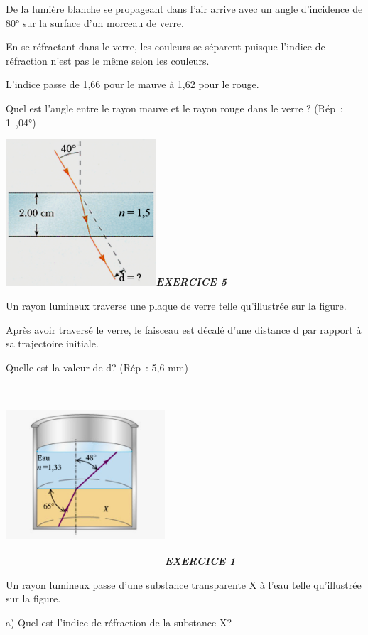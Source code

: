 De la lumière blanche se propageant dans l'air arrive avec un angle
d'incidence de 80° sur la surface d'un morceau de verre.

En se réfractant dans le verre, les couleurs se séparent puisque
l'indice de réfraction n'est pas le même selon les couleurs.

L'indice passe de 1,66 pour le mauve à 1,62 pour le rouge.

Quel est l'angle entre le rayon mauve et le rayon rouge dans le
verre\textbf{ }? (Rép~: 1~,04°)

\includegraphics[width=5.597cm,height=5.456cm]{Pictures/10000001000002CA000002B85275081FCFD04057.png}\emph{\textbf{EXERCICE
5}}

Un rayon lumineux traverse une plaque de verre telle qu'illustrée sur la
figure.

Après avoir traversé le verre, le faisceau est décalé d'une distance d
par rapport à sa trajectoire initiale.

Quelle est la valeur de d? (Rép~: 5,6 mm)

\includegraphics[width=5.927cm,height=6.713cm]{Pictures/10000001000003FC0000033DD06925E04B0F5051.png}\emph{\textbf{EXERCICE
1}}

Un rayon lumineux passe d'une substance transparente X à l'eau telle
qu'illustrée sur la figure.

a) Quel est l'indice de réfraction de la substance X?

